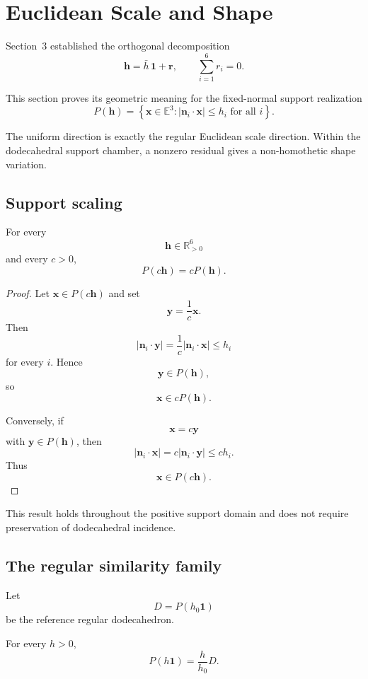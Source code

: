 \section{Euclidean Scale and Shape}

Section~3 established the orthogonal decomposition
\[
\mathbf h
=
\bar h\,\mathbf 1+\mathbf r,
\qquad
\sum_{i=1}^{6}r_i=0.
\]

This section proves its geometric meaning for the fixed-normal support
realization
\[
P(\mathbf h)
=
\left\{
\mathbf x\in\mathbb E^3:
|\mathbf n_i\cdot\mathbf x|\le h_i
\text{ for all }i
\right\}.
\]

The uniform direction is exactly the regular Euclidean scale direction.
Within the dodecahedral support chamber, a nonzero residual gives a
non-homothetic shape variation.

\subsection{Support scaling}

\begin{theorem}
For every
\[
\mathbf h\in\mathbb R_{>0}^6
\]
and every \(c>0\),
\[
P(c\mathbf h)=cP(\mathbf h).
\]
\end{theorem}

\begin{proof}
Let \(\mathbf x\in P(c\mathbf h)\) and set
\[
\mathbf y=\frac{1}{c}\mathbf x.
\]
Then
\[
|\mathbf n_i\cdot\mathbf y|
=
\frac{1}{c}|\mathbf n_i\cdot\mathbf x|
\le h_i
\]
for every \(i\). Hence
\[
\mathbf y\in P(\mathbf h),
\]
so
\[
\mathbf x\in cP(\mathbf h).
\]

Conversely, if
\[
\mathbf x=c\mathbf y
\]
with \(\mathbf y\in P(\mathbf h)\), then
\[
|\mathbf n_i\cdot\mathbf x|
=
c|\mathbf n_i\cdot\mathbf y|
\le ch_i.
\]
Thus
\[
\mathbf x\in P(c\mathbf h).
\]
\end{proof}

This result holds throughout the positive support domain and does not
require preservation of dodecahedral incidence.

\subsection{The regular similarity family}

Let
\[
D=P(h_0\mathbf 1)
\]
be the reference regular dodecahedron.

For every \(h>0\),
\[
P(h\mathbf 1)
=
\frac{h}{h_0}D.
\]


